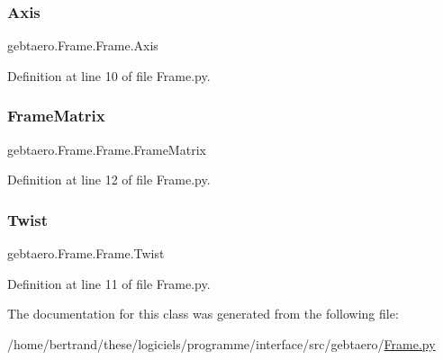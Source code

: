 \subsubsection{\texorpdfstring{Axis}{Axis}}
{\footnotesize\ttfamily gebtaero.\+Frame.\+Frame.\+Axis}



Definition at line 10 of file Frame.\+py.

\mbox{\label{classgebtaero_1_1_frame_1_1_frame_ac066f787b43713ffdce16e36acfbfdee}} 
\subsubsection{\texorpdfstring{Frame\+Matrix}{FrameMatrix}}
{\footnotesize\ttfamily gebtaero.\+Frame.\+Frame.\+Frame\+Matrix}



Definition at line 12 of file Frame.\+py.

\mbox{\label{classgebtaero_1_1_frame_1_1_frame_ab64cc356fbc0c271e985c7d6694e31bc}} 
\subsubsection{\texorpdfstring{Twist}{Twist}}
{\footnotesize\ttfamily gebtaero.\+Frame.\+Frame.\+Twist}



Definition at line 11 of file Frame.\+py.



The documentation for this class was generated from the following file\+:\begin{DoxyCompactItemize}
\item 
/home/bertrand/these/logiciels/programme/interface/src/gebtaero/\hyperlink{_frame_8py}{Frame.\+py}\end{DoxyCompactItemize}
